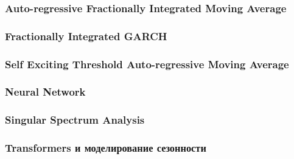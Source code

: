 		\subsubsection{Auto-regressive Fractionally Integrated Moving Average}
		\subsubsection{Fractionally Integrated GARCH}
		\subsubsection{Self Exciting Threshold Auto-regressive Moving Average}
		\subsubsection{Neural Network}
		\subsubsection{Singular Spectrum Analysis}
		\subsubsection{Transformers и моделирование сезонности}
